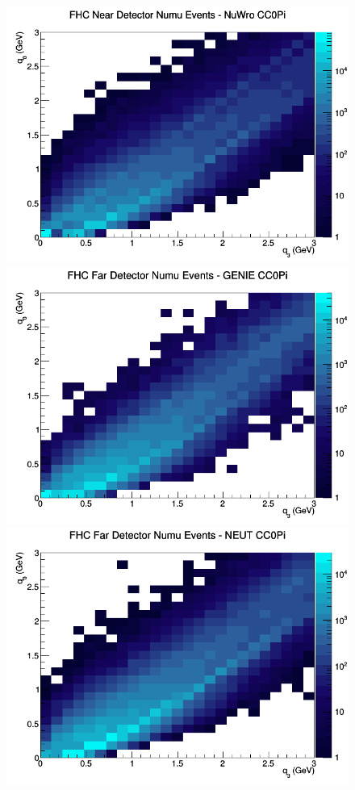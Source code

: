 \documentclass[12pt]{article}
\begin{document}
\begin{figure}[h]
\includegraphics[width=\linewidth]{eff_q0_q3/FGT/CC0Pi_FHC_ND_numu_q3_q0_NuWro.png}
\endminipage
\newline
{}
\includegraphics[width=\linewidth]{eff_q0_q3/FGT/CC0Pi_FHC_FD_numu_q3_q0_GENIE.png}
\endminipage
{}
\includegraphics[width=\linewidth]{eff_q0_q3/FGT/CC0Pi_FHC_FD_numu_q3_q0_NEUT.png}

\end{figure}
\end{document}
